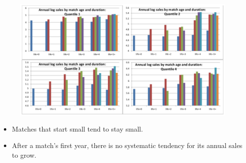 \documentclass[notes=show]{beamer}
\begin{document}
\begin{frame}%

\begin{figure}[ptb]\centering
    \includegraphics[scale=0.35] {figs/match_dyn.png}%
\end{figure}%
\bigskip

\begin{itemize}
\item Matches that start small tend to stay small.

\item After a match's first year, there is no systematic tendency for its
annual sales to grow.
\end{itemize}

\end{frame}%
\end{document}
